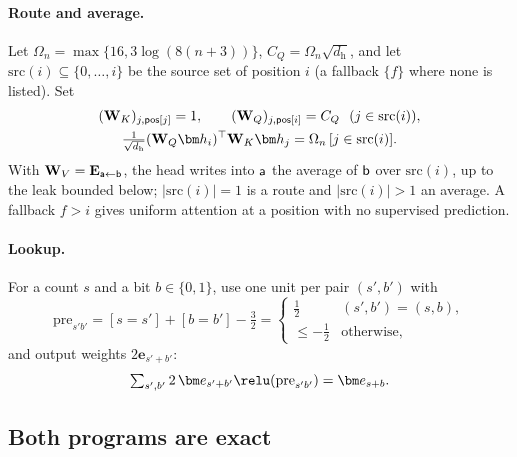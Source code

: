\paragraph{Route and average.} Let $\Omega_n=\max\{16,3\log(8(n+3))\}$, $C_Q=\Omega_n\sqrt{d_{\mathrm h}}$, and let $\mathrm{src}(i)\subseteq\{0,\ldots,i\}$ be the source set
of position $i$ (a fallback $\{f\}$ where none is listed). Set
\begin{equation}
 \begin{gathered}
 (\mathbf W_K)_{j,\reg{pos}[j]}=1,\qquad (\mathbf W_Q)_{j,\reg{pos}[i]}=C_Q\ \ (j\in\mathrm{src}(i)),\\
 \tfrac{1}{\sqrt{d_{\mathrm h}}}(\mathbf W_Q\bm h_i)^\top \mathbf W_K\bm h_j=\Omega_n\,[j\in\mathrm{src}(i)] .
 \end{gathered}
 \label{eq:route}
\end{equation}
With $\mathbf W_V=\mathbf E_{\mathsf{a}\leftarrow\mathsf{b}}$, the head writes into $\mathsf{a}$ the average of $\mathsf{b}$ over $\mathrm{src}(i)$, up to the leak bounded below; $|\mathrm{src}(i)|=1$ is a
route and $|\mathrm{src}(i)|>1$ an average. A fallback $f>i$ gives uniform attention at a position with no supervised prediction.

\paragraph{Lookup.} For a count $s$ and a bit $b\in\{0,1\}$, use one unit per pair $(s',b')$ with
\[
 \mathrm{pre}_{s'b'}=[s=s']+[b=b']-\tfrac{3}{2}=\begin{cases}\tfrac{1}{2}&(s',b')=(s,b),\\\le-\tfrac{1}{2}&\text{otherwise},\end{cases}
\]
and output weights $2\bm e_{s'+b'}$:
\begin{equation}
 \textstyle\sum_{s',b'}2\,\bm e_{s'+b'}\relu(\mathrm{pre}_{s'b'})=\bm e_{s+b}.
 \label{eq:lookup}
\end{equation}

\subsection{Both programs are exact}
\label{app:exact}

